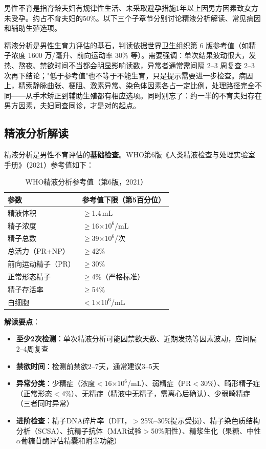 \documentclass[12pt,a4paper,twoside]{ctexbook}
\begin{document}
男性不育是指育龄夫妇有规律性生活、未采取避孕措施1年以上因男方因素致女方未受孕。约占不育夫妇的50\%。以下三个子章节分别讨论精液分析解读、常见病因和辅助生殖选项。


精液分析是男性生育力评估的基石，判读依据世界卫生组织第 6 版参考值（如精子浓度 1600 万/毫升、前向运动率 30\% 等）。需要强调：单次结果波动很大，发热、熬夜、禁欲时间不当都会明显影响读数，异常者通常需间隔 2--3 周复查 2--3 次再下结论；"低于参考值"也不等于不能生育，只是提示需要进一步检查。病因上，精索静脉曲张、梗阻、激素异常、染色体因素各占一定比例，处理路径完全不同——从手术矫正到辅助生殖都有相应选项。同时别忘了：约一半的不育夫妇存在男方因素，夫妇同查同诊，才是对的起点。

\subsection{精液分析解读}

精液分析是男性不育评估的\textbf{基础检查}。WHO第6版《人类精液检查与处理实验室手册》（2021）参考值如下：

\begin{table}[htbp]
\centering
\caption{WHO精液分析参考值（第6版，2021）}
\label{tab:semen_analysis_who}
\begin{tabularx}{\textwidth}{@{}lX@{}}
    \toprule
    \textbf{参数} & \textbf{参考值下限（第5百分位）} \\
    \midrule
    精液体积 & $\ge$1.4\,mL \\
    精子浓度 & $\ge$16$\times10^6$/mL \\
    精子总数 & $\ge$39$\times10^6$/次 \\
    总活力（PR+NP） & $\ge$42\% \\
    前向运动精子（PR） & $\ge$30\% \\
    正常形态精子 & $\ge$4\%（严格标准） \\
    精子存活率 & $\ge$54\% \\
    白细胞 & $<$1$\times10^6$/mL \\
    \bottomrule
\end{tabularx}
\end{table}

\textbf{解读要点}：
\begin{itemize}[leftmargin=2cm]
	\item \textbf{至少2次检测}：单次精液分析可能因禁欲天数、近期发热等因素波动，应间隔2--4周复查
	\item \textbf{禁欲时间}：检测前禁欲2--7天，通常建议3--5天
	\item \textbf{异常分类}：少精症（浓度$<$16$\times10^6$/mL）、弱精症（PR$<$30\%）、畸形精子症（正常形态$<$4\%）、无精症（精液中无精子，需离心后确认）、少弱畸精症（三者同时异常）
	\item \textbf{进阶检查}：精子DNA碎片率（DFI，$>$25\%--30\%提示受损）、精子染色质结构分析（SCSA）、抗精子抗体（MAR试验$>$50\%阳性）、精浆生化（果糖、中性$\alpha$葡糖苷酶评估精囊和附睾功能）
\end{itemize}
\end{document}
